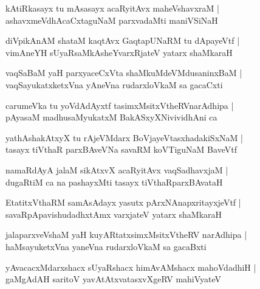 \documentclass[twoside,12pt,openright]{book}
\newcounter{shloka}[chapter]
\begin{document}
\begin{shloka}
kAtiRkasayx tu mAsasayx acaRyitAvx maheVshavxraM |\\ 
ashavxmeVdhAcaCxtaguNaM parxvadaMti maniVSiNaH
\end{shloka}

\begin{shloka}
diVpikAnAM shataM kaqtAvx GaqtapUNaRM tu dApayeVtf |\\
vimAneYH sUyaRsaMkAsheYvarxRjateV yatarx shaMkaraH
\end{shloka}

\begin{shloka}
vaqSaBaM yaH parxyaceCxVta shaMkuMdeVMdusaninxBaM |\\
vaqSayukatxketxVna yAneVna rudarxloVkaM sa gacaCxti
\end{shloka}

\begin{shloka}
carumeVka tu yoVdAdAyxtf tasimxMsitxVtheRVnarAdhipa |\\
pAyasaM madhusaMyukatxM BakASxyXNivividhAni ca
\end{shloka}

\begin{shloka}
yathAshakAtxyX tu rAjeVMdarx BoVjayeVtasxhadakiSxNaM |\\
tasayx tiVthaR parxBAveVNa savaRM koVTiguNaM BaveVtf
\end{shloka}

\begin{shloka}
namaRdAyA jalaM sikAtxvX acaRyitAvx vaqSadhavxjaM |\\
dugaRtiM ca na pashayxMti tasayx tiVthaRparxBAvataH
\end{shloka}


\begin{shloka}
EtatitxVthaRM samAsAdayx yasutx pArxNAnapxritayxjeVtf |\\
savaRpApavishudadhxtAmx varxjateV yatarx shaMkaraH
\end{shloka}

\begin{shloka}
jalaparxveVshaM yaH kuyARtatxsimxMsitxVtheRV narAdhipa |\\
haMsayuketxVna yaneVna rudarxloVkaM sa gacaBxti
\end{shloka}

\begin{shloka}
yAvacacxMdarxshacx sUyaRshacx himAvAMshacx mahoVdadhiH |\\
gaMgAdAH saritoV yavAtAtxvatasxvXgeRV mahiVyateV
\end{shloka}
\end{document}

